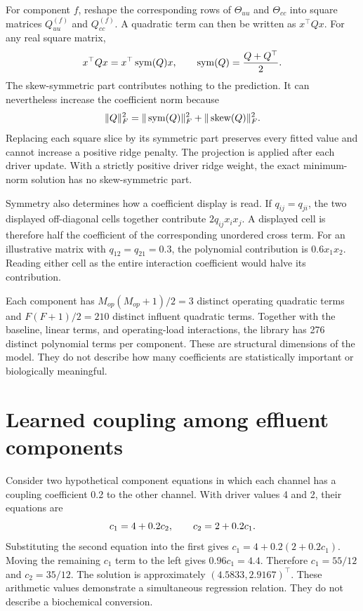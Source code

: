 For component \(f\), reshape the corresponding rows of \(\Theta_{uu}\) and \(\Theta_{cc}\) into square matrices \(Q_{uu}^{(f)}\) and \(Q_{cc}^{(f)}\). A quadratic term can then be written as \(x^\top Qx\). For any real square matrix,
\begin{equation}
\equationname{Symmetric coefficient matrix of a quadratic form}
\label{eq:icsor_quadratic_symmetry}
x^\top Qx=x^\top\operatorname{sym}(Q)x,
\qquad
\operatorname{sym}(Q)=\frac{Q+Q^\top}{2}.
\end{equation}
The skew-symmetric part contributes nothing to the prediction. It can nevertheless increase the coefficient norm because
\begin{equation}
\equationname{Frobenius-norm decomposition into symmetric and skew parts}
\label{eq:icsor_quadratic_norm}
\|Q\|_F^2=
\|\operatorname{sym}(Q)\|_F^2+
\|\operatorname{skew}(Q)\|_F^2.
\end{equation}
Replacing each square slice by its symmetric part preserves every fitted value and cannot increase a positive ridge penalty. The projection is applied after each driver update. With a strictly positive driver ridge weight, the exact minimum-norm solution has no skew-symmetric part.

Symmetry also determines how a coefficient display is read. If \(q_{ij}=q_{ji}\), the two displayed off-diagonal cells together contribute \(2q_{ij}x_i x_j\). A displayed cell is therefore half the coefficient of the corresponding unordered cross term. For an illustrative matrix with \(q_{12}=q_{21}=0.3\), the polynomial contribution is \(0.6x_1x_2\). Reading either cell as the entire interaction coefficient would halve its contribution.

Each component has \(M_{op}(M_{op}+1)/2=3\) distinct operating quadratic terms and \(F(F+1)/2=210\) distinct influent quadratic terms. Together with the baseline, linear terms, and operating-load interactions, the library has 276 distinct polynomial terms per component. These are structural dimensions of the model. They do not describe how many coefficients are statistically important or biologically meaningful.

\section{Learned coupling among effluent components}

Consider two hypothetical component equations in which each channel has a coupling coefficient 0.2 to the other channel. With driver values 4 and 2, their equations are
\begin{equation}
\equationname{Illustrative coupled equations for two effluent components}
\label{eq:icsor_scalar_coupling_example}
c_1=4+0.2c_2,
\qquad c_2=2+0.2c_1.
\end{equation}
Substituting the second equation into the first gives \(c_1=4+0.2(2+0.2c_1)\). Moving the remaining \(c_1\) term to the left gives \(0.96c_1=4.4\). Therefore \(c_1=55/12\) and \(c_2=35/12\). The solution is approximately \((4.5833,2.9167)^\top\). These arithmetic values demonstrate a simultaneous regression relation. They do not describe a biochemical conversion.

